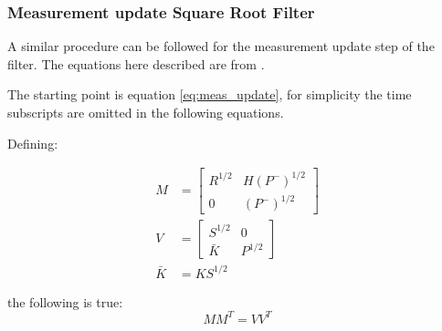 \documentclass{article}
\begin{document}
\subsubsection{Measurement update Square Root Filter}

A similar procedure can be followed for the measurement update step of the filter. The equations here described are from \cite{dan_simon_optimal_2006}.

The starting point is equation \ref{eq:meas_update}, for simplicity the time subscripts are omitted in the following equations.

Defining:

\begin{align}
    M &= \begin{bmatrix} R^{1/2} & H(P^-)^{1/2} \\ 0 & (P^-)^{1/2} \end{bmatrix} \\
    V &= \begin{bmatrix} S^{1/2} & 0 \\ \bar{K} & P^{1/2} \end{bmatrix} \\
    \bar{K} &= KS^{1/2}
\end{align}
    
the following is true:
\begin{equation}\label{update_SR_mult}
    MM^T = VV^T
\end{equation}
\end{document}
